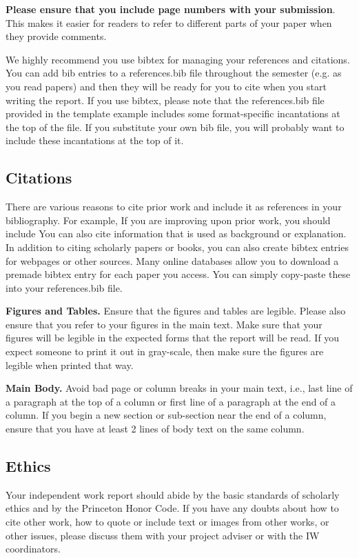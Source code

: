 \documentclass[pageno]{jpaper}
\begin{document}
\textbf{Please ensure that you include page numbers with your
submission}. This makes it easier for readers to refer to
different parts of your paper when they provide comments.

We highly recommend you use bibtex for managing your references and citations.  You can add bib entries to a references.bib file throughout the semester (e.g. as you read papers) and then they will be ready for you to cite when you start writing the report.  If you use bibtex, please note that the references.bib file provided in the template example includes some format-specific incantations at the top of the file.  If you substitute your own bib file, you will probably want to include these 
incantations at the top of it.

\subsection{Citations}

There are various reasons to cite prior work and include it as references in your bibliography.  For example, If you are improving upon 
prior work, you should include
You can also cite information that is used as background or explanation.  In addition to citing scholarly papers or books, you can also create bibtex entries for webpages or other sources.  Many online databases allow you to download a premade bibtex entry for each paper you access.  You can simply copy-paste these into your references.bib file.

\noindent\textbf{Figures and Tables.} Ensure that the figures and
tables are legible.  Please also ensure that you refer to your
figures in the main text. Make sure that your figures will be legible
in the expected forms that the report will be read.  If you expect someone
to print it out in gray-scale, then make sure the figures are legible 
when printed that way.  

\noindent\textbf{Main Body.} Avoid bad page or column breaks in
your main text, i.e., last line of a paragraph at the top of a
column or first line of a paragraph at the end of a column. If you
begin a new section or sub-section near the end of a column,
ensure that you have at least 2 lines of body text on the same
column. 

\subsection{Ethics}

Your independent work report should abide by the basic standards of scholarly ethics and by the Princeton Honor Code. If you have any doubts about how to cite
other work, how to quote or include text or images from other works, or other issues, please discuss them with your project adviser or with the IW coordinators. 


\end{document}
